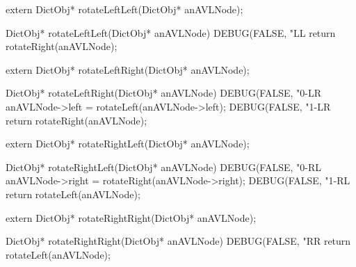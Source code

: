 \startCHeader
extern DictObj* rotateLeftLeft(DictObj* anAVLNode);
\stopCHeader

\startCCode
DictObj* rotateLeftLeft(DictObj* anAVLNode) {
  DEBUG(FALSE, "LL %
  return rotateRight(anAVLNode);
}
\stopCCode

\startCHeader
extern DictObj* rotateLeftRight(DictObj* anAVLNode);
\stopCHeader

\startCCode
DictObj* rotateLeftRight(DictObj* anAVLNode) {
  DEBUG(FALSE, "0-LR %
  anAVLNode->left = rotateLeft(anAVLNode->left);
  DEBUG(FALSE, "1-LR %
  return rotateRight(anAVLNode);
}
\stopCCode

\startCHeader
extern DictObj* rotateRightLeft(DictObj* anAVLNode);
\stopCHeader

\startCCode
DictObj* rotateRightLeft(DictObj* anAVLNode) {
  DEBUG(FALSE, "0-RL %
  anAVLNode->right = rotateRight(anAVLNode->right);
  DEBUG(FALSE, "1-RL %
  return rotateLeft(anAVLNode);
}
\stopCCode

\startCHeader
extern DictObj* rotateRightRight(DictObj* anAVLNode);
\stopCHeader

\startCCode
DictObj* rotateRightRight(DictObj* anAVLNode) {
  DEBUG(FALSE, "RR %
  return rotateLeft(anAVLNode);
}
\stopCCode

